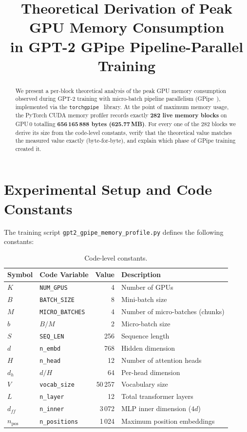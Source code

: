 \documentclass[11pt,a4paper]{article}
\title{Theoretical Derivation of Peak GPU Memory Consumption \\
in GPT-2 GPipe Pipeline-Parallel Training}
\author{}
\date{}
\begin{document}
\maketitle

\begin{abstract}
We present a per-block theoretical analysis of the peak GPU memory consumption observed during GPT-2 training with micro-batch pipeline parallelism (GPipe~\cite{huang2019gpipe}), implemented via the \texttt{torchgpipe}~\cite{kim2020torchgpipe} library.
At the point of maximum memory usage, the PyTorch CUDA memory profiler records exactly \textbf{282 live memory blocks} on GPU\,0 totalling \textbf{656\,165\,888 bytes (625.77\,MB)}.
For every one of the 282 blocks we derive its size from the code-level constants, verify that the theoretical value matches the measured value exactly (byte-for-byte), and explain which phase of GPipe training created it.
\end{abstract}

\section{Experimental Setup and Code Constants}
\label{sec:constants}

The training script \texttt{gpt2\_gpipe\_memory\_profile.py} defines the following constants:

\begin{table}[h]
\centering
\caption{Code-level constants.}
\label{tab:constants}
\begin{tabular}{llrl}
\toprule
\textbf{Symbol} & \textbf{Code Variable} & \textbf{Value} & \textbf{Description} \\
\midrule
$K$ & \texttt{NUM\_GPUS} & 4 & Number of GPUs \\
$B$ & \texttt{BATCH\_SIZE} & 8 & Mini-batch size \\
$M$ & \texttt{MICRO\_BATCHES} & 4 & Number of micro-batches (chunks) \\
$b$ & $B / M$ & 2 & Micro-batch size \\
$S$ & \texttt{SEQ\_LEN} & 256 & Sequence length \\
$d$ & \texttt{n\_embd} & 768 & Hidden dimension \\
$H$ & \texttt{n\_head} & 12 & Number of attention heads \\
$d_h$ & $d / H$ & 64 & Per-head dimension \\
$V$ & \texttt{vocab\_size} & 50\,257 & Vocabulary size \\
$L$ & \texttt{n\_layer} & 12 & Total transformer layers \\
$d_{ff}$ & \texttt{n\_inner} & 3\,072 & MLP inner dimension ($4d$) \\
$n_{\text{pos}}$ & \texttt{n\_positions} & 1\,024 & Maximum position embeddings \\
\bottomrule
\end{tabular}
\end{table}
\end{document}
